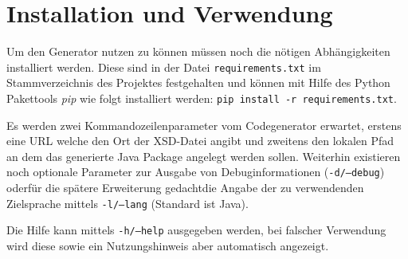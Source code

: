 \section{Installation und Verwendung}

Um den Generator nutzen zu können müssen noch die nötigen Abhängigkeiten installiert werden. Diese sind in der Datei \texttt{requirements.txt} im Stammverzeichnis des Projektes festgehalten und können mit Hilfe des Python Pakettools \emph{pip} wie folgt installiert werden: \texttt{pip install -r requirements.txt}.

Es werden zwei Kommandozeilenparameter vom Codegenerator erwartet, erstens eine \gls{URL} welche den Ort der \gls{XSD}-Datei angibt und zweitens den lokalen Pfad an dem das generierte Java Package angelegt werden sollen. Weiterhin existieren noch optionale Parameter zur Ausgabe von Debuginformationen (\texttt{-d/--debug}) oder\textemdash{}für die spätere Erweiterung gedacht\textemdash{}die Angabe der zu verwendenden Zielsprache mittels \texttt{-l/--lang} (Standard ist Java).

Die Hilfe kann mittels \texttt{-h/--help} ausgegeben werden, bei falscher Verwendung wird diese sowie ein Nutzungshinweis aber automatisch angezeigt.
